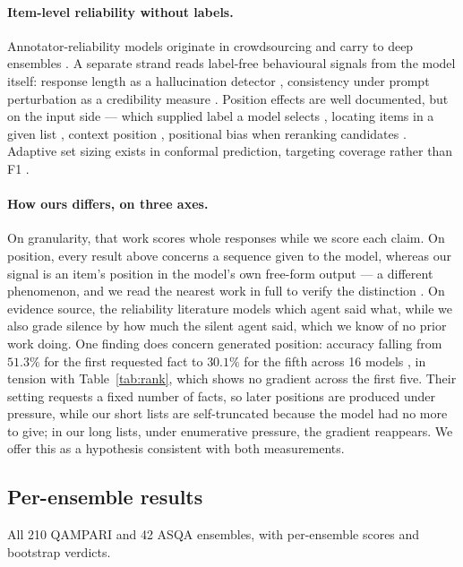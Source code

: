 \documentclass{article}
\begin{document}
\paragraph{Item-level reliability without labels.}
Annotator-reliability models originate in crowdsourcing \cite{dawid1979maximum,sinha2018fast,majdi2023crowd} and carry to deep ensembles \cite{kuzin2025improving}. A separate strand reads label-free behavioural signals from the model itself: response length as a hallucination detector \cite{janiak2025illusion,zhang2024verbosity}, consistency under prompt perturbation as a credibility measure \cite{wu2026this,ahn2025prompt}. Position effects are well documented, but on the input side --- which supplied label a model selects \cite{guo2024serial}, locating items in a given list \cite{zhang2026position}, context position \cite{salvatore2025lost}, positional bias when reranking candidates \cite{qiao2026llm,yan2026evirank}. Adaptive set sizing exists in conformal prediction, targeting coverage rather than F1 \cite{gauthier2025adaptive}.

\paragraph{How ours differs, on three axes.}
On granularity, that work scores whole responses while we score each claim. On position, every result above concerns a sequence given to the model, whereas our signal is an item's position in the model's own free-form output --- a different phenomenon, and we read the nearest work in full to verify the distinction \cite{guo2024serial}. On evidence source, the reliability literature models which agent said what, while we also grade silence by how much the silent agent said, which we know of no prior work doing. One finding does concern generated position: accuracy falling from $51.3\%$ for the first requested fact to $30.1\%$ for the fifth across 16 models \cite{islam2025curious}, in tension with Table~\ref{tab:rank}, which shows no gradient across the first five. Their setting requests a fixed number of facts, so later positions are produced under pressure, while our short lists are self-truncated because the model had no more to give; in our long lists, under enumerative pressure, the gradient reappears. We offer this as a hypothesis consistent with both measurements.

\subsection{Per-ensemble results}
\label{app:ensembles}
All 210 QAMPARI and 42 ASQA ensembles, with per-ensemble scores and bootstrap verdicts.
\end{document}
